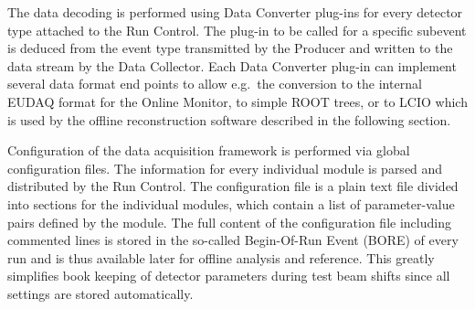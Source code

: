 The data decoding is performed using Data Converter plug-ins for every detector type attached to the Run Control. 
The plug-in to be called for a specific subevent is deduced from the event type transmitted by the Producer and written to the data stream by the Data Collector. 
Each Data Converter plug-in can implement several data format end points to allow e.g.\ the conversion to the internal EUDAQ format for the Online Monitor, to simple ROOT trees, or to LCIO
 which is used by the offline reconstruction software described in the following section.

Configuration of the data acquisition framework is performed via global configuration files. 
The information for every individual module is parsed and distributed by the Run Control. 
The configuration file is a plain text file divided into sections for the individual modules, which contain a list of parameter-value pairs defined by the module.
The full content of the configuration file including commented lines is stored in the so-called Begin-Of-Run Event (BORE) of every run and is thus available later for offline analysis and reference. 
This greatly simplifies book keeping of detector parameters during test beam shifts since all settings are stored automatically.
